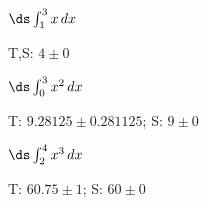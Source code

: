 %
%
%
%
%
%



\begin{ex}
 $\ds\int_1^3 x\,dx$
\begin{sol}
 T,S: $4\pm0$
\end{sol}
\end{ex}

\begin{ex}
 $\ds\int_0^3 x^2\,dx$
\begin{sol}
 T: $9.28125\pm0.281125 $; S: $9\pm0$
\end{sol}
\end{ex}

\begin{ex}
 $\ds\int_2^4 x^3\,dx$
\begin{sol}
 T: $60.75\pm1$; S: $60\pm0$
\end{sol}
\end{ex}

